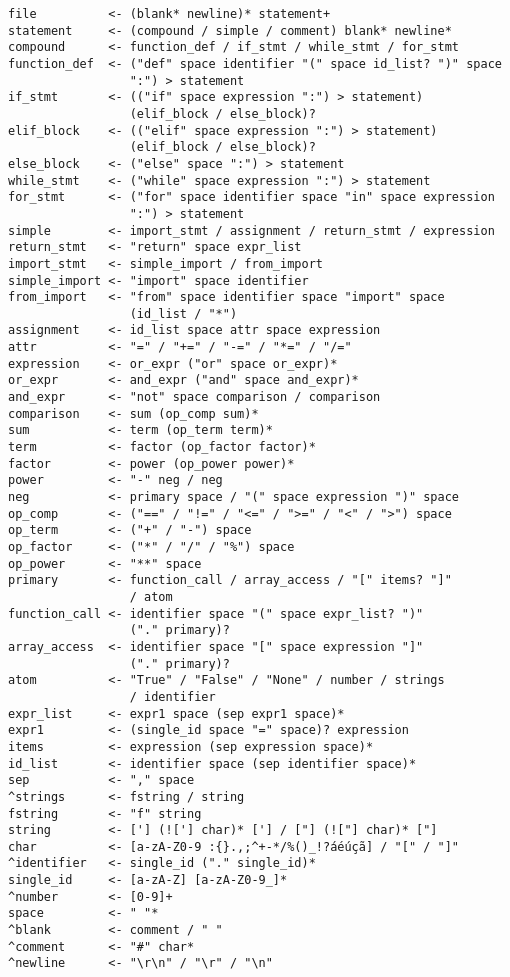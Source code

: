 \begin{verbatim}
file          <- (blank* newline)* statement+
statement     <- (compound / simple / comment) blank* newline*
compound      <- function_def / if_stmt / while_stmt / for_stmt
function_def  <- ("def" space identifier "(" space id_list? ")" space 
                 ":") > statement
if_stmt       <- (("if" space expression ":") > statement) 
                 (elif_block / else_block)?
elif_block    <- (("elif" space expression ":") > statement) 
                 (elif_block / else_block)?
else_block    <- ("else" space ":") > statement
while_stmt    <- ("while" space expression ":") > statement
for_stmt      <- ("for" space identifier space "in" space expression 
                 ":") > statement
simple        <- import_stmt / assignment / return_stmt / expression
return_stmt   <- "return" space expr_list
import_stmt   <- simple_import / from_import
simple_import <- "import" space identifier
from_import   <- "from" space identifier space "import" space 
                 (id_list / "*")
assignment    <- id_list space attr space expression
attr          <- "=" / "+=" / "-=" / "*=" / "/="
expression    <- or_expr ("or" space or_expr)*
or_expr       <- and_expr ("and" space and_expr)*
and_expr      <- "not" space comparison / comparison
comparison    <- sum (op_comp sum)*
sum           <- term (op_term term)* 
term          <- factor (op_factor factor)*
factor        <- power (op_power power)*
power         <- "-" neg / neg
neg           <- primary space / "(" space expression ")" space
op_comp       <- ("==" / "!=" / "<=" / ">=" / "<" / ">") space
op_term       <- ("+" / "-") space
op_factor     <- ("*" / "/" / "%") space
op_power      <- "**" space
primary       <- function_call / array_access / "[" items? "]" 
                 / atom
function_call <- identifier space "(" space expr_list? ")" 
                 ("." primary)?
array_access  <- identifier space "[" space expression "]" 
                 ("." primary)?
atom          <- "True" / "False" / "None" / number / strings 
                 / identifier
expr_list     <- expr1 space (sep expr1 space)*
expr1         <- (single_id space "=" space)? expression
items         <- expression (sep expression space)*
id_list       <- identifier space (sep identifier space)*
sep           <- "," space
^strings      <- fstring / string
fstring       <- "f" string
string        <- ['] (!['] char)* ['] / ["] (!["] char)* ["]
char          <- [a-zA-Z0-9 :{}.,;^+-*/%()_!?áéúçã] / "[" / "]"
^identifier   <- single_id ("." single_id)*
single_id     <- [a-zA-Z] [a-zA-Z0-9_]*
^number       <- [0-9]+
space         <- " "*
^blank        <- comment / " "
^comment      <- "#" char*
^newline      <- "\r\n" / "\r" / "\n"
\end{verbatim}
